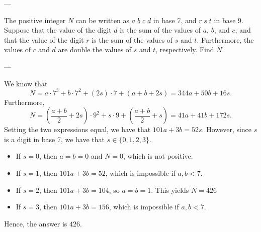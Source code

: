 
---

The positive integer $N$ can be written as $\underline a\;\underline b\;\underline c\;\underline d$ in base $7$, and $\underline r\;\underline s\;\underline t$ in base $9$. Suppose that the value of the digit $d$ is the sum of the values of $a$, $b$, and $c$, and that the value of the digit $r$ is the sum of the values of $s$ and $t$. Furthermore, the values of $c$ and $d$ are double the values of $s$ and $t$, respectively. Find $N$.

---

We know that \[N=a\cdot 7^3+b\cdot 7^2+(2s)\cdot 7+(a+b+2s)=344a+50b+16s.\]
Furthermore, \[N=\left(\frac{a+b}2+2s\right)\cdot 9^2+s\cdot 9+\left(\frac{a+b}2+s\right)=41a+41b+172s.\]
Setting the two expressions equal, we have that $101a+3b=52s$. However, since $s$ is a digit in base $7$, we have that $s\in\{0,1,2,3\}$.
\begin{itemize}[itemsep=0em]
    \item If $s=0$, then $a=b=0$ and $N=0$, which is not positive.
    \item If $s=1$, then $101a+3b=52$, which is impossible if $a,b<7$.
    \item If $s=2$, then $101a+3b=104$, so $a=b=1$. This yields $N=426$
    \item If $s=3$, then $101a+3b=156$, which is impossible if $a,b<7$.
\end{itemize}
Hence, the answer is $426$.

